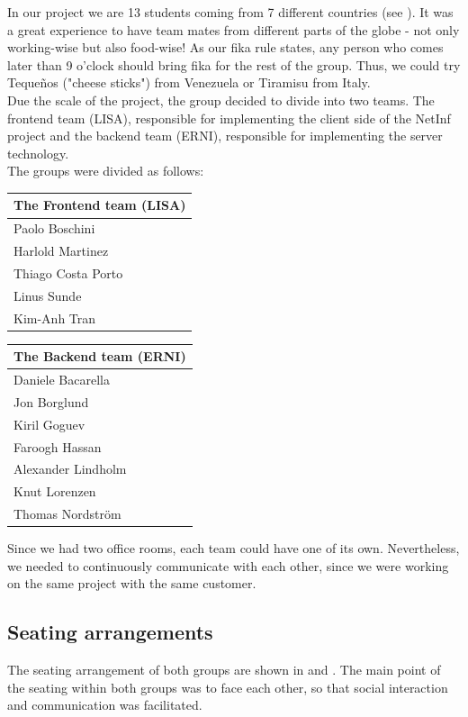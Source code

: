 In our project we are 13 students coming from 7 different countries (see ).
It was a great experience to have team mates from different parts of the globe - not
only working-wise but also food-wise! As our fika rule states, any person who comes later
than 9 o'clock should bring fika for the rest of the group. Thus, we could
try Teque\~{n}os ("cheese sticks") from Venezuela or Tiramisu from Italy.\\

Due the scale of the project, the group decided to divide into two teams. 
The frontend team (LISA), responsible for implementing the client side of the NetInf project and the backend team (ERNI), responsible for implementing the server technology.\\

The groups were divided as follows:

\begin{minipage}[b]{0.32\hsize}\centering
\begin{tabular}{l}
The Frontend team (LISA) \\\hline
Paolo Boschini\\
Harlold Martinez\\
Thiago Costa Porto\\
Linus Sunde\\
Kim-Anh Tran
\end{tabular}
\end{minipage}
\hfill
\begin{minipage}[b]{0.32\hsize}\centering
\begin{tabular}{l}
The Backend team (ERNI) \\\hline
Daniele Bacarella\\
Jon Borglund\\
Kiril Goguev\\
Faroogh Hassan\\
Alexander Lindholm\\
Knut Lorenzen\\
Thomas Nordstr\"om
\end{tabular}
\end{minipage}

Since we had two office rooms, each team could have one of its own.
Nevertheless, we needed to continuously communicate with each other,
since we were working on the same project with the same customer.

\subsection{Seating arrangements}
The seating arrangement of both groups are shown in  and
. The main point of the seating within both groups
was to face each other, so that social interaction and communication was facilitated. 

